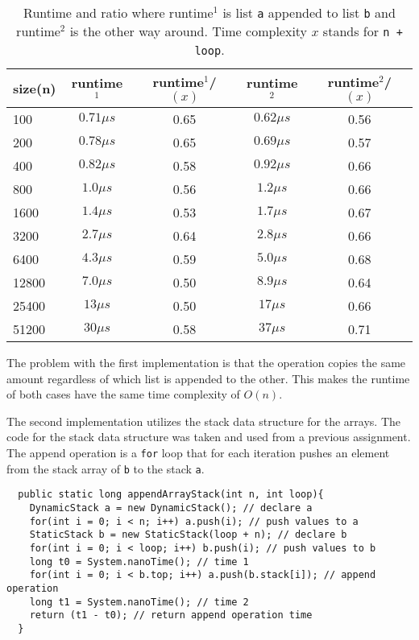 \documentclass[a4paper,11pt]{article}
\begin{document}
\begin{table}[h]
  \begin{center}
  \begin{tabular}{l|c|c|c|c}
  \textbf{size(n)} & \textbf{runtime$^1$} & \textbf{runtime$^1$/$(x)$} 
  & \textbf{runtime$^2$} & \textbf{runtime$^2$/$(x)$}\\
  \hline
    100     & $ 0.71 \mu s$ &   0.65  & $ 0.62 \mu s$ &   0.56\\
    200     & $ 0.78 \mu s$ &   0.65  & $ 0.69 \mu s$ &   0.57\\
    400     & $ 0.82 \mu s$ &   0.58  & $ 0.92 \mu s$ &   0.66\\
    800     & $ 1.0 \mu s$  &   0.56  & $ 1.2 \mu s$  &   0.66\\
    1600    & $ 1.4 \mu s$  &   0.53  & $ 1.7 \mu s$  &   0.67\\
    3200    & $ 2.7 \mu s$  &   0.64  & $ 2.8 \mu s$  &   0.66\\
    6400    & $ 4.3 \mu s$  &   0.59  & $ 5.0 \mu s$  &   0.68\\
    12800   & $ 7.0 \mu s$  &   0.50  & $ 8.9 \mu s$  &   0.64\\
    25400   & $ 13 \mu s$   &   0.50  & $ 17 \mu s$   &   0.66\\
    51200   & $ 30 \mu s$   &   0.58  & $ 37 \mu s$   &   0.71\\ 
  \end{tabular}
  \caption{Runtime and ratio where runtime$^1$ is list {\tt a} appended
          to list {\tt b} and runtime$^2$ is the other way around. Time
          complexity $x$ stands for {\tt n + loop}.}
  \label{tab:table2}
  \end{center}
\end{table}

The problem with the first implementation is that the operation copies
the same amount regardless of which list is appended to the other. 
This makes the runtime of both cases have the same time complexity of
$ O(n)$.

The second implementation utilizes the stack data structure for the
arrays. The code for the stack data structure was taken and used from a 
previous assignment. The append operation is a {\tt for} loop that
for each iteration pushes an element from the stack array of {\tt b} to
the stack {\tt a}.

\begin{verbatim}
  public static long appendArrayStack(int n, int loop){
    DynamicStack a = new DynamicStack(); // declare a
    for(int i = 0; i < n; i++) a.push(i); // push values to a
    StaticStack b = new StaticStack(loop + n); // declare b
    for(int i = 0; i < loop; i++) b.push(i); // push values to b
    long t0 = System.nanoTime(); // time 1
    for(int i = 0; i < b.top; i++) a.push(b.stack[i]); // append operation
    long t1 = System.nanoTime(); // time 2
    return (t1 - t0); // return append operation time
  }
\end{verbatim}
\end{document}
